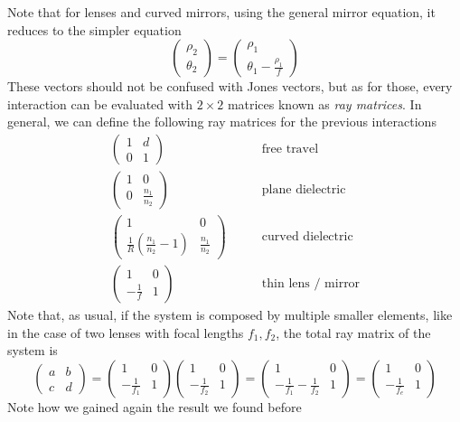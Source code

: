 \documentclass[../electromagnetism.tex]{subfiles}
\begin{document}
Note that for lenses and curved mirrors, using the general mirror equation, it reduces to the simpler equation
\begin{equation}
	\begin{pmatrix}
		\rho_2\\
		\theta_2
	\end{pmatrix}=\begin{pmatrix}
		\rho_1\\
		\theta_1-\frac{\rho_1}{f}
	\end{pmatrix}
	\label{eq:mirror.ray}
\end{equation}
These vectors should not be confused with Jones vectors, but as for those, every interaction can be evaluated with $2\times2$ matrices known as \textit{ray matrices}. In general, we can define the following ray matrices for the previous interactions
\begin{equation}
	\begin{aligned}
		\begin{pmatrix}
			1&d\\0&1
		\end{pmatrix}&\qquad\text{free travel}\\
		\begin{pmatrix}
			1&0\\
			0&\frac{n_1}{n_2}
		\end{pmatrix}&\qquad\text{plane dielectric}\\
		\begin{pmatrix}
			1&0\\
			\frac{1}{R}\left( \frac{n_1}{n_2}-1 \right)&\frac{n_1}{n_2}
		\end{pmatrix}&\qquad\text{curved dielectric}\\
		\begin{pmatrix}
			1&0\\
			-\frac{1}{f}&1
		\end{pmatrix}&\qquad\text{thin lens / mirror}
	\end{aligned}
	\label{eq:useful-matrices.ray}
\end{equation}
Note that, as usual, if the system is composed by multiple smaller elements, like in the case of two lenses with focal lengths $f_1, f_2$, the total ray matrix of the system is
\begin{equation*}
	\begin{pmatrix}
		a&b\\c&d
	\end{pmatrix}=\begin{pmatrix}
		1&0\\-\frac{1}{f_1}&1
	\end{pmatrix}\begin{pmatrix}
		1&0\\-\frac{1}{f_2}&1
	\end{pmatrix}=\begin{pmatrix}
		1&0\\
		-\frac{1}{f_1}-\frac{1}{f_2}&1
	\end{pmatrix}=\begin{pmatrix}
		1&0\\
		-\frac{1}{f_e}&1
	\end{pmatrix}
\end{equation*}
Note how we gained again the result we found before
\end{document}
